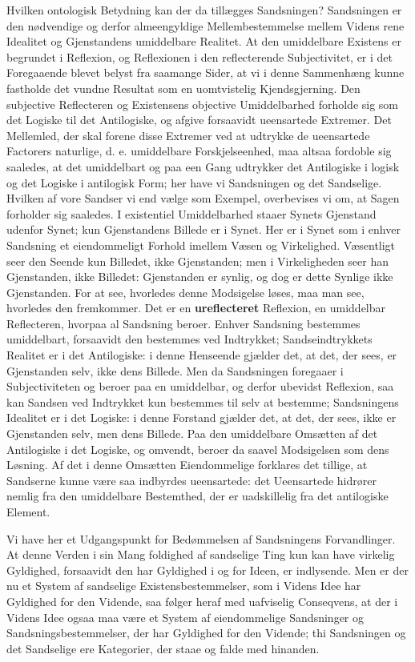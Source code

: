 \documentclass[11pt]{book}
\newcommand{\opage}[1]{\marginnote{\footnotesize\textit{[#1]}}}
\begin{document}
Hvilken ontologisk Betydning kan der da tillægges Sandsningen?
Sandsningen er den nødvendige og derfor almeengyldige
Mellembestemmelse mellem Videns rene Idealitet og Gjenstandens
umiddelbare Realitet. At den umiddelbare Existens er begrundet i
Reflexion, og Reflexionen i den reflecterende Subjectivitet, er i det
Foregaaende blevet belyst fra saamange Sider, at vi i denne
Sammenhæng kunne fastholde det vundne Resultat som en uomtvistelig
Kjendsgjerning. Den subjective Reflecteren og Existensens objective
Umiddelbarhed forholde sig som det Logiske til det Antilogiske, og
afgive forsaavidt ueensartede Extremer. Det Mellemled, der skal forene
disse Extremer ved at udtrykke de ueensartede Factorers naturlige,
d. e. umiddelbare Forskjelseenhed, maa altsaa fordoble sig saaledes, at
det umiddelbart og paa een Gang udtrykker det Antilogiske i logisk og
det Logiske i antilogisk Form; her have vi Sandsningen og det
Sandselige. Hvilken af vore Sandser vi end vælge som Exempel,
overbevises vi om, at Sagen forholder sig saaledes. I existentiel
Umiddelbarhed staaer Synets Gjenstand udenfor Synet; kun Gjenstandens
Billede er i Synet. Her er i Synet som i enhver Sandsning et
eiendommeligt Forhold imellem Væsen og Virkelighed. Væsentligt seer
den Seende kun Billedet, ikke Gjenstanden; men i Virkeligheden seer han
Gjenstanden, ikke Billedet: Gjenstanden er synlig, og dog er dette
Synlige ikke Gjenstanden. For
\opage{256} \setcounter{footnote}{0}%
at see, hvorledes denne Modsigelse løses, maa man see, hvorledes den
fremkommer. Det er en \textbf{ureflecteret} Reflexion, en umiddelbar
Reflecteren, hvorpaa al Sandsning beroer. Enhver Sandsning bestemmes
umiddelbart, forsaavidt den bestemmes ved Indtrykket;
Sandseindtrykkets Realitet er i det Antilogiske: i denne Henseende
gjælder det, at det, der sees, er Gjenstanden selv, ikke dens Billede.
Men da Sandsningen foregaaer i Subjectiviteten og beroer paa en
umiddelbar, og derfor ubevidst Reflexion, saa kan Sandsen ved
Indtrykket kun bestemmes til selv at bestemme; Sandsningens Idealitet
er i det Logiske: i denne Forstand gjælder det, at det, der sees, ikke
er Gjenstanden selv, men dens Billede. Paa den umiddelbare Omsætten af
det Antilogiske i det Logiske, og omvendt, beroer da saavel
Modsigelsen som dens Løsning. Af det i denne Omsætten Eiendommelige
forklares det tillige, at Sandserne kunne være saa indbyrdes
ueensartede: det Ueensartede hidrører nemlig fra den umiddelbare
Bestemthed, der er uadskillelig fra det antilogiske Element.

Vi have her et Udgangspunkt for Bedømmelsen af Sandsningens
Forvandlinger. At denne Verden i sin Mang\-%
foldighed af sandselige Ting kun kan have virkelig Gyldighed,
forsaavidt den har Gyldighed i og for Ideen, er indlysende. Men er der
nu et System af sandselige Existensbestemmelser, som i Videns Idee har
Gyldighed for den Vidende, saa følger heraf med uafviselig Conseqvens,
at der i Videns Idee ogsaa maa være et System af eiendommelige
Sandsninger og Sandsningsbestemmelser, der har Gyldighed for den
Vidende; thi Sandsningen og det Sandselige ere Kategorier, der staae og
falde med hinanden.
\end{document}
